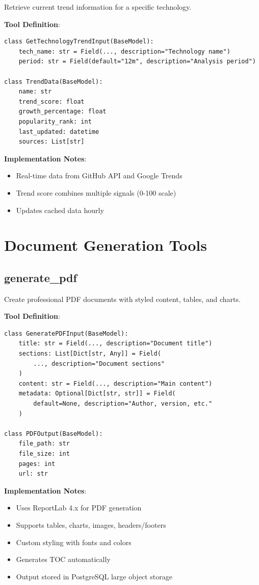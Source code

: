 \documentclass{report}
\begin{document}
Retrieve current trend information for a specific technology.

\textbf{Tool Definition}:
\begin{lstlisting}
class GetTechnologyTrendInput(BaseModel):
    tech_name: str = Field(..., description="Technology name")
    period: str = Field(default="12m", description="Analysis period")

class TrendData(BaseModel):
    name: str
    trend_score: float
    growth_percentage: float
    popularity_rank: int
    last_updated: datetime
    sources: List[str]
\end{lstlisting}

\textbf{Implementation Notes}:
\begin{itemize}
    \item Real-time data from GitHub API and Google Trends
    \item Trend score combines multiple signals (0-100 scale)
    \item Updates cached data hourly
\end{itemize}

\section{Document Generation Tools}

\subsection{generate\_pdf}

Create professional PDF documents with styled content, tables, and charts.

\textbf{Tool Definition}:
\begin{lstlisting}
class GeneratePDFInput(BaseModel):
    title: str = Field(..., description="Document title")
    sections: List[Dict[str, Any]] = Field(
        ..., description="Document sections"
    )
    content: str = Field(..., description="Main content")
    metadata: Optional[Dict[str, str]] = Field(
        default=None, description="Author, version, etc."
    )

class PDFOutput(BaseModel):
    file_path: str
    file_size: int
    pages: int
    url: str
\end{lstlisting}

\textbf{Implementation Notes}:
\begin{itemize}
    \item Uses ReportLab 4.x for PDF generation
    \item Supports tables, charts, images, headers/footers
    \item Custom styling with fonts and colors
    \item Generates TOC automatically
    \item Output stored in PostgreSQL large object storage
\end{itemize}
\end{document}
